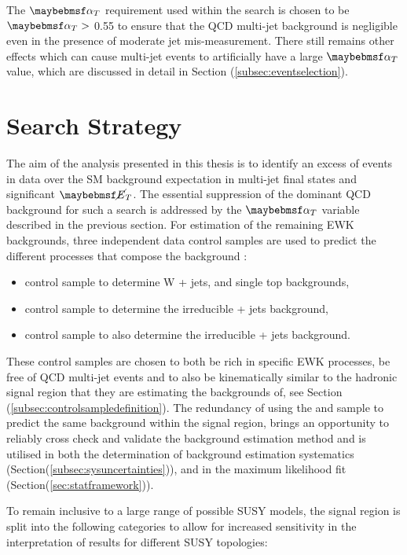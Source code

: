 The $\alphat$ requirement used within the search is chosen to be $\alphat >$ 0.55 to ensure that the QCD multi-jet background is negligible even in the presence of moderate jet mis-measurement. There still remains other effects which can cause multi-jet events to artificially have a large $\alphat$ value, which are discussed in detail in Section (\ref{subsec:eventselection}).  


\section{Search Strategy}
\label{subsec:searchstrategy}

The aim of the analysis presented in this thesis is to identify an excess of events in data over the \ac{SM} background expectation in multi-jet final states and significant $\met$. The essential suppression of the dominant QCD background for such a search is addressed by the $\alphat$ variable described in the previous section. For estimation of the remaining \ac{EWK} backgrounds, three independent data control samples are used to predict the different processes that compose the background :

\begin{itemize}
\item \mupjets control sample to determine W + jets, \ttbar and single top backgrounds,
\item \gpjets control sample to determine the irreducible \zinv + jets background,
\item \dimupjets control sample to also determine the irreducible \zinv + jets background.
\end{itemize}

These control samples are chosen to both be rich in specific \ac{EWK} processes, be free of QCD multi-jet events and to also be kinematically similar to the hadronic signal region that they are estimating the backgrounds of, see Section (\ref{subsec:controlsampledefinition}). The redundancy of using the \gpjets and \dimupjets sample to predict the same background within the signal region, brings an opportunity to reliably cross check and validate the background estimation method and is utilised in both the determination of background estimation systematics (Section(\ref{subsec:sysuncertainties})), and in the maximum likelihood fit (Section(\ref{sec:statframework})).

To remain inclusive to a large range of possible \ac{SUSY} models, the signal region is split into the following categories to allow for increased sensitivity in the interpretation of results for different \ac{SUSY} topologies:

